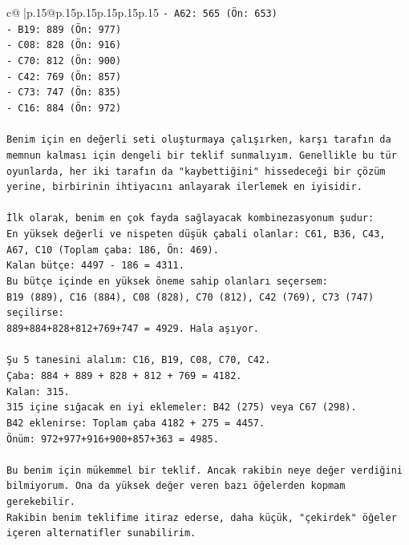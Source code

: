 \documentclass{article}
\begin{document}
{\begin{supertabular}{c@{$\;$}|p{.15\linewidth}@{}p{.15\linewidth}p{.15\linewidth}p{.15\linewidth}p{.15\linewidth}p{.15\linewidth}}
{{{\texttt{{-} A62: 565 (Ön: 653)} \\
\texttt{{-} B19: 889 (Ön: 977)} \\
\texttt{{-} C08: 828 (Ön: 916)} \\
\texttt{{-} C70: 812 (Ön: 900)} \\
\texttt{{-} C42: 769 (Ön: 857)} \\
\texttt{{-} C73: 747 (Ön: 835)} \\
\texttt{{-} C16: 884 (Ön: 972)} \\
\\ 
\texttt{Benim için en değerli seti oluşturmaya çalışırken, karşı tarafın da memnun kalması için dengeli bir teklif sunmalıyım. Genellikle bu tür oyunlarda, her iki tarafın da "kaybettiğini" hissedeceği bir çözüm yerine, birbirinin ihtiyacını anlayarak ilerlemek en iyisidir.} \\
\\ 
\texttt{İlk olarak, benim en çok fayda sağlayacak kombinezasyonum şudur:} \\
\texttt{En yüksek değerli ve nispeten düşük çabali olanlar: C61, B36, C43, A67, C10 (Toplam çaba: 186, Ön: 469).} \\
\texttt{Kalan bütçe: 4497 {-} 186 = 4311.} \\
\texttt{Bu bütçe içinde en yüksek öneme sahip olanları seçersem:} \\
\texttt{B19 (889), C16 (884), C08 (828), C70 (812), C42 (769), C73 (747) seçilirse:} \\
\texttt{889+884+828+812+769+747 = 4929. Hala aşıyor.} \\
\\ 
\texttt{Şu 5 tanesini alalım: C16, B19, C08, C70, C42.} \\
\texttt{Çaba: 884 + 889 + 828 + 812 + 769 = 4182.} \\
\texttt{Kalan: 315.} \\
\texttt{315 içine sığacak en iyi eklemeler: B42 (275) veya C67 (298).} \\
\texttt{B42 eklenirse: Toplam çaba 4182 + 275 = 4457.} \\
\texttt{Önüm: 972+977+916+900+857+363 = 4985.} \\
\\ 
\texttt{Bu benim için mükemmel bir teklif. Ancak rakibin neye değer verdiğini bilmiyorum. Ona da yüksek değer veren bazı öğelerden kopmam gerekebilir.} \\
\texttt{Rakibin benim teklifime itiraz ederse, daha küçük, "çekirdek" öğeler içeren alternatifler sunabilirim.} \\
}}}
\end{supertabular}}
\end{document}
